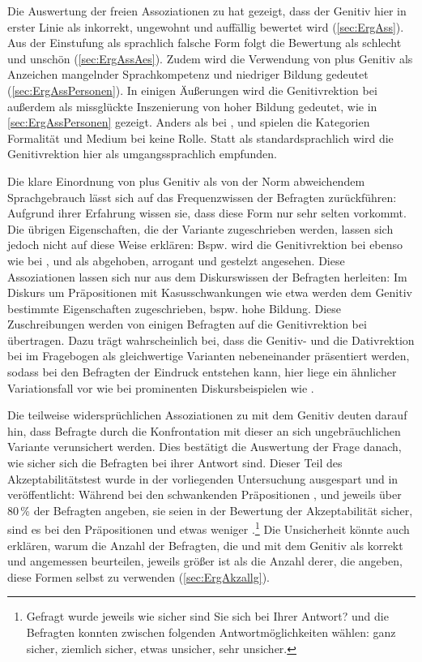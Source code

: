 Die Auswertung der freien Assoziationen zu \gegenueber{} hat gezeigt, dass der Genitiv hier in erster Linie als inkorrekt, ungewohnt und auffällig bewertet wird (\autoref{sec:ErgAss}). 
Aus der Einstufung als sprachlich falsche Form folgt die Bewertung als schlecht und unschön (\autoref{sec:ErgAssAes}). 
Zudem wird die Verwendung von \gegenueber{} plus Genitiv als Anzeichen mangelnder Sprachkompetenz und niedriger Bildung gedeutet (\autoref{sec:ErgAssPersonen}). 
In einigen Äußerungen wird die Genitivrektion bei \gegenueber{} außerdem als missglückte Inszenierung von hoher Bildung gedeutet, wie in \autoref{sec:ErgAssPersonen} gezeigt. 
Anders als bei \wegen, \waehrend{} und \dank{} spielen die Kategorien Formalität und Medium bei \gegenueber{} keine Rolle. 
Statt als standardsprachlich wird die Genitivrektion hier als umgangssprachlich empfunden. 

Die klare Einordnung von \gegenueber{} plus Genitiv als von der Norm abweichendem Sprachgebrauch lässt sich auf das Frequenzwissen der Befragten zurückführen: 
Aufgrund ihrer Erfahrung wissen sie, dass diese Form nur sehr selten vorkommt. 
Die übrigen Eigenschaften, die der Variante zugeschrieben werden, lassen sich jedoch nicht auf diese Weise erklären: 
Bspw. wird die Genitivrektion bei \gegenueber{} ebenso wie bei \wegen, \waehrend{} und \dank{} als abgehoben, arrogant und gestelzt angesehen. 
Diese Assoziationen lassen sich nur aus dem Diskurswissen der Befragten herleiten: 
Im Diskurs um Präpositionen mit Kasusschwankungen wie etwa \wegen{} werden dem Genitiv bestimmte Eigenschaften zugeschrieben, bspw. hohe Bildung.
Diese Zuschreibungen werden von einigen Befragten auf die Genitivrektion bei \gegenueber{} übertragen. 
Dazu trägt wahrscheinlich bei, dass die Genitiv- und die Dativrektion bei \gegenueber{} im Fragebogen als gleichwertige Varianten nebeneinander präsentiert werden, sodass bei den Befragten der Eindruck entstehen kann, hier liege ein ähnlicher Variationsfall vor wie bei prominenten Diskursbeispielen wie \wegen. 

Die teilweise widersprüchlichen Assoziationen zu \gegenueber{} mit dem Genitiv deuten darauf hin, dass Befragte durch die Konfrontation mit dieser an sich ungebräuchlichen Variante verunsichert werden. 
Dies bestätigt die Auswertung der Frage danach, wie sicher sich die Befragten bei ihrer Antwort sind. 
Dieser Teil des Akzeptabilitätstest wurde in der vorliegenden Untersuchung ausgespart und in \citet[][]{Vieregge.2019b} veröffentlicht: 
Während bei den schwankenden Präpositionen \wegen, \waehrend{} und \dank{} jeweils über 80\,\% der Befragten angeben, sie seien in der Bewertung der Akzeptabilität sicher, sind es bei den Präpositionen \gegenueber{} und  etwas weniger \citep[s.][88--90]{Vieregge.2019b}.\footnote{Gefragt wurde jeweils \glqq wie sicher sind Sie sich bei Ihrer Antwort?\grqq{} und die Befragten konnten zwischen folgenden Antwortmöglichkeiten wählen: ganz sicher, ziemlich sicher, etwas unsicher, sehr unsicher.} 
Die Unsicherheit könnte auch erklären, warum die Anzahl der Befragten, die \gegenueber{} und  mit dem Genitiv als korrekt und angemessen beurteilen, jeweils größer ist als die Anzahl derer, die angeben, diese Formen selbst zu verwenden (\autoref{sec:ErgAkzallg}). 

